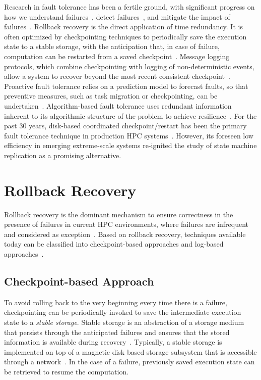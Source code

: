 Research in fault tolerance has been a fertile ground, with significant progress on how we understand failures~\cite{cfdr,Cappello:09:Fault,calhoun2017towards}, detect failures~\cite{bosilca2016failure,fiala_2012_sdc,di2016adaptive}, and mitigate the
impact of failures~\cite{bland2013post,herault2015practical,fang2017letgo}. Rollback recovery is the direct application of time redundancy. It is often optimized by checkpointing techniques to periodically save
the execution state to a stable storage, with the anticipation
that, in case of failure, computation can be restarted from
a saved checkpoint~\cite{chandy_trans_1985}. Message logging protocols, which
combine checkpointing with logging of non-deterministic
events, allow a system to recover beyond the most recent
consistent checkpoint~\cite{strom1985optimistic}. Proactive fault tolerance relies
on a prediction model to forecast faults, so that preventive
measures, such as task migration or checkpointing, can be
undertaken~\cite{6468487,engelmann2009proactive,chakravorty2006proactive,liang2006bluegene}. Algorithm-based fault tolerance
uses redundant information inherent to its algorithmic structure of the problem to achieve resilience~\cite{luk1988analysis,bosilca2009algorithm}. For the past 30
years, disk-based coordinated checkpoint/restart has been the primary fault
tolerance technique in production HPC systems~\cite{ferreira_sc_2011}. However, its foreseen low efficiency in emerging extreme-scale systems re-ignited the study of state machine replication as a promising alternative.




\section{Rollback Recovery}
 
Rollback recovery is the dominant mechanism to ensure correctness in the presence of failures in current HPC environments, where failures are infrequent and considered as exception~\cite{Deconinck93surveyof,Elnozahy:02:Survey,Egwutuoha2013}. Based on rollback recovery, techniques available today can be classified into checkpoint-based approaches and log-based approaches~\cite{Elnozahy:02:Survey}.

\subsection{Checkpoint-based Approach}
To avoid rolling back to the very beginning every time there is a failure, checkpointing can be periodically invoked to save the intermediate execution state to a \textit{stable storage}. Stable storage is an abstraction of a storage medium that persists through the anticipated failures and ensures that the stored information is available during recovery~\cite{Elnozahy:02:Survey}. Typically, a stable storage is implemented on top of a magnetic disk based storage subsystem that is accessible through a network~\cite{silva1998using}. In the case of a failure, previously saved execution state can be retrieved to resume the computation. 

